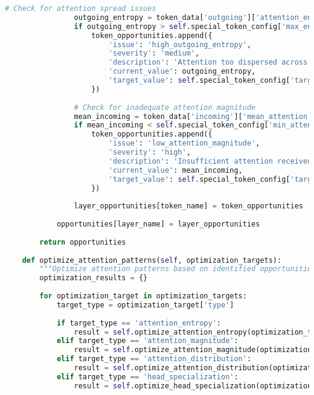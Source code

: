 \begin{lstlisting}[language=Python, caption=Attention pattern analysis and optimization framework]
                # Check for attention spread issues
                outgoing_entropy = token_data['outgoing']['attention_entropy']
                if outgoing_entropy > self.special_token_config['max_entropy_threshold']:
                    token_opportunities.append({
                        'issue': 'high_outgoing_entropy',
                        'severity': 'medium',
                        'description': 'Attention too dispersed across targets',
                        'current_value': outgoing_entropy,
                        'target_value': self.special_token_config['target_entropy_range']
                    })
                
                # Check for inadequate attention magnitude
                mean_incoming = token_data['incoming']['mean_attention']
                if mean_incoming < self.special_token_config['min_attention_threshold']:
                    token_opportunities.append({
                        'issue': 'low_attention_magnitude',
                        'severity': 'high',
                        'description': 'Insufficient attention received by special token',
                        'current_value': mean_incoming,
                        'target_value': self.special_token_config['target_attention_range']
                    })
                
                layer_opportunities[token_name] = token_opportunities
            
            opportunities[layer_name] = layer_opportunities
        
        return opportunities
    
    def optimize_attention_patterns(self, optimization_targets):
        """Optimize attention patterns based on identified opportunities."""
        optimization_results = {}
        
        for optimization_target in optimization_targets:
            target_type = optimization_target['type']
            
            if target_type == 'attention_entropy':
                result = self.optimize_attention_entropy(optimization_target)
            elif target_type == 'attention_magnitude':
                result = self.optimize_attention_magnitude(optimization_target)
            elif target_type == 'attention_distribution':
                result = self.optimize_attention_distribution(optimization_target)
            elif target_type == 'head_specialization':
                result = self.optimize_head_specialization(optimization_target)
            

\end{lstlisting}
